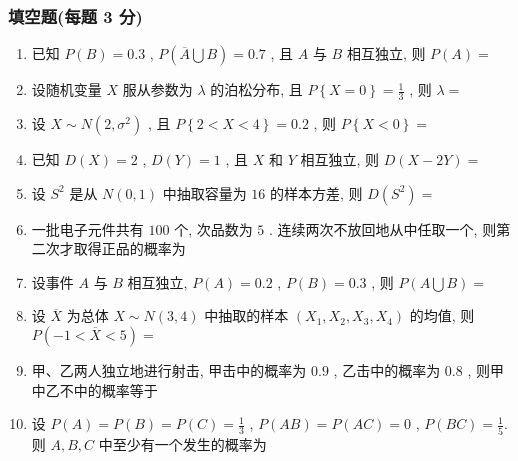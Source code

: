  \subsubsection{填空题(每题 3 分)}
 \begin{enumerate}
	\item 已知 $P(B)=0.3$ , $P\left(\overline{A}\bigcup B\right)=0.7$ , 且 $A$ 与 $B$ 相互独立, 则 $P(A)=$\underline{\hspace{8pc}}
	
	\item 设随机变量 $X$ 服从参数为 $\lambda$ 的泊松分布, 且 $P\left\{X=0\right\}=\frac{1}{3}$ , 则 $\lambda=$\underline{\hspace{8pc}}
	
	\item 设 $X\sim N\left(2,\sigma^2\right)$ , 且 $P\left\{2<X<4\right\}=0.2$ , 则 $P\left\{X<0\right\}=$\underline{\hspace{8pc}}
	
	\item 已知 $D(X)=2$ , $D(Y)=1$ , 且 $X$ 和 $Y$ 相互独立, 则 $D(X-2Y)=$\underline{\hspace{8pc}}
	
	\item 设 $S^2$ 是从 $N(0,1)$ 中抽取容量为 $16$ 的样本方差, 则 $D\left(S^2\right)=$\underline{\hspace{8pc}}

	\item 一批电子元件共有 $100$ 个, 次品数为 $5$ . 连续两次不放回地从中任取一个, 则第二次才取得正品的概率为\underline{\hspace{8pc}}
	
	\item 设事件 $A$ 与 $B$ 相互独立, $P(A)=0.2$ , $P(B)=0.3$ , 则 $P\left(A\bigcup B\right)=$\underline{\hspace{8pc}}
	
	\item 设 $\overline{X}$ 为总体 $X\sim N(3,4)$ 中抽取的样本 $(X_1,X_2,X_3,X_4)$ 的均值, 则 $P\left(-1<\overline{X}<5\right)=$
	
	\underline{\hspace{8pc}}
	
	\item 甲、乙两人独立地进行射击, 甲击中的概率为 $0.9$ , 乙击中的概率为 $0.8$ , 则甲中乙不中的概率等于\underline{\hspace{8pc}}
	
	\item 设 $P(A)=P(B)=P(C)=\frac{1}{3}$ , $ P(AB)=P(AC)=0$ , $ P(BC)=\frac{1}{5}$. 则 $A, B, C$ 中至少有一个发生的概率为\underline{\hspace{8pc}}
	

\end{enumerate}
